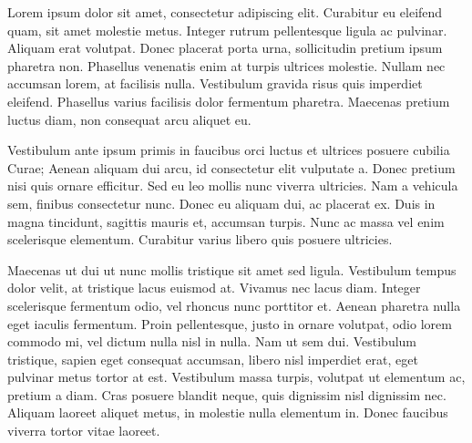 \documentclass[11pt, a4paper]{awesome-cv} %
\begin{document}
\makecvheader[R] %

\makelettertitle %


\begin{cvletter}



 Lorem ipsum dolor sit amet, consectetur adipiscing elit. Curabitur eu eleifend quam, sit amet molestie metus. Integer rutrum pellentesque ligula ac pulvinar. Aliquam erat volutpat. Donec placerat porta urna, sollicitudin pretium ipsum pharetra non. Phasellus venenatis enim at turpis ultrices molestie. Nullam nec accumsan lorem, at facilisis nulla. Vestibulum gravida risus quis imperdiet eleifend. Phasellus varius facilisis dolor fermentum pharetra. Maecenas pretium luctus diam, non consequat arcu aliquet eu. 



 Vestibulum ante ipsum primis in faucibus orci luctus et ultrices posuere cubilia Curae; Aenean aliquam dui arcu, id consectetur elit vulputate a. Donec pretium nisi quis ornare efficitur. Sed eu leo mollis nunc viverra ultricies. Nam a vehicula sem, finibus consectetur nunc. Donec eu aliquam dui, ac placerat ex. Duis in magna tincidunt, sagittis mauris et, accumsan turpis. Nunc ac massa vel enim scelerisque elementum. Curabitur varius libero quis posuere ultricies. 


 Maecenas ut dui ut nunc mollis tristique sit amet sed ligula. Vestibulum tempus dolor velit, at tristique lacus euismod at. Vivamus nec lacus diam. Integer scelerisque fermentum odio, vel rhoncus nunc porttitor et. Aenean pharetra nulla eget iaculis fermentum. Proin pellentesque, justo in ornare volutpat, odio lorem commodo mi, vel dictum nulla nisl in nulla. Nam ut sem dui. Vestibulum tristique, sapien eget consequat accumsan, libero nisl imperdiet erat, eget pulvinar metus tortor at est. Vestibulum massa turpis, volutpat ut elementum ac, pretium a diam. Cras posuere blandit neque, quis dignissim nisl dignissim nec. Aliquam laoreet aliquet metus, in molestie nulla elementum in. Donec faucibus viverra tortor vitae laoreet. 

\end{cvletter}


\makeletterclosing %
\end{document}
